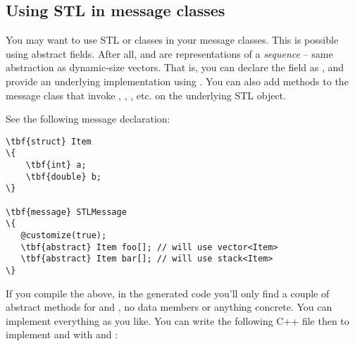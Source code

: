 \subsection{Using STL in message classes}







You may want to use STL  or  classes in your message classes.
This is possible using abstract fields. After all,  and 
are representations of a \textit{sequence} -- same abstraction as dynamic-size vectors.
That is, you can declare the field as , and provide
an underlying implementation using . You can also add methods
to the message class that invoke , , , etc.
on the underlying STL object.

See the following message declaration:

\begin{Verbatim}[commandchars=\\\{\}]
\tbf{struct} Item
\{
    \tbf{int} a;
    \tbf{double} b;
\}

\tbf{message} STLMessage
\{
   @customize(true);
   \tbf{abstract} Item foo[]; // will use vector<Item>
   \tbf{abstract} Item bar[]; // will use stack<Item>
\}
\end{Verbatim}

If you compile the above, in the generated code you'll only find a couple of
abstract methods for  and , no data members or anything concrete.
You can implement everything as you like. You can write the following C++ file
then to implement  and  with  and :

